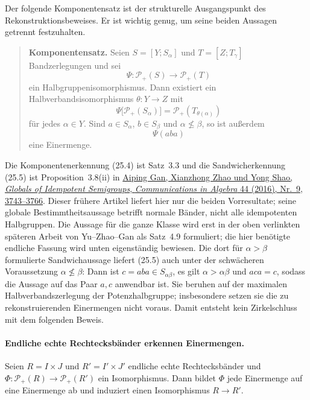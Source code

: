 \documentclass[main.tex]{subfiles}
\begin{document}
Der folgende Komponentensatz ist der strukturelle Ausgangspunkt des
Rekonstruktionsbeweises.  Er ist wichtig genug, um seine beiden Aussagen
getrennt festzuhalten.

\begin{quote}
\textbf{Komponentensatz.}
Seien
\(S=[Y;S_\alpha]\) und \(T=[Z;T_\gamma]\) Bandzerlegungen und sei
\[
  \Psi\colon\mathcal P_+(S)\longrightarrow\mathcal P_+(T)
\]
ein Halbgruppenisomorphismus.  Dann existiert ein
Halbverbandsisomorphismus \(\theta\colon Y\to Z\) mit
\[
  \Psi\bigl[\mathcal P_+(S_\alpha)\bigr]
     =\mathcal P_+(T_{\theta(\alpha)})                    \tag{25.4}
\]
für jedes \(\alpha\in Y\).  Sind
\(a\in S_\alpha\), \(b\in S_\beta\) und
\(\alpha\nleq\beta\), so ist außerdem
\[
  \Psi(aba)                                                \tag{25.5}
\]
eine Einermenge.
\end{quote}

Die Komponentenerkennung (25.4) ist Satz~3.3 und die
Sandwicherkennung (25.5) ist Proposition~3.8(ii) in
\href{https://doi.org/10.1080/00927872.2015.1087006}%
  {Aiping Gan, Xianzhong Zhao und Yong Shao,
  \emph{Globals of Idempotent Semigroups},
  \emph{Communications in Algebra} 44 (2016), Nr.~9, 3743--3766}.
Dieser frühere Artikel liefert hier nur die beiden Vorresultate; seine
globale Bestimmtheitsaussage betrifft normale Bänder, nicht alle
idempotenten Halbgruppen.  Die Aussage für die ganze Klasse wird erst in der
oben verlinkten späteren Arbeit von Yu--Zhao--Gan als Satz~4.9 formuliert;
die hier benötigte endliche Fassung wird unten eigenständig bewiesen.
Die dort für \(\alpha>\beta\) formulierte Sandwichaussage liefert
(25.5) auch unter der schwächeren Voraussetzung
\(\alpha\nleq\beta\): Dann ist
\(c=aba\in S_{\alpha\beta}\), es gilt
\(\alpha>\alpha\beta\) und \(aca=c\), sodass die Aussage auf das Paar
\(a,c\) anwendbar ist.
Sie beruhen auf der maximalen Halbverbandszerlegung der Potenzhalbgruppe;
insbesondere setzen sie die zu rekonstruierenden Einermengen nicht voraus.
Damit entsteht kein Zirkelschluss mit dem folgenden Beweis.

\paragraph{Endliche echte Rechtecksbänder erkennen Einermengen.}
Seien \(R=I\times J\) und \(R'=I'\times J'\) endliche echte
Rechtecksbänder und
\(\Phi\colon\mathcal P_+(R)\to\mathcal P_+(R')\) ein
Isomorphismus.  Dann bildet \(\Phi\) jede Einermenge auf eine Einermenge
ab und induziert einen Isomorphismus \(R\to R'\).
\end{document}
